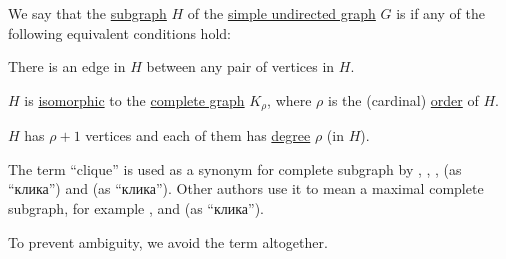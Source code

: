 \begin{definition}\label{def:complete_subgraph}\mimprovised
  We say that the \hyperref[def:undirected_graph/subgraph]{subgraph} \( H \) of the \hyperref[def:undirected_graph]{simple undirected graph} \( G \) is  if any of the following equivalent conditions hold:
  \begin{thmenum}
     There is an edge in \( H \) between any pair of vertices in \( H \).

     \( H \) is \hyperref[def:undirected_graph/homomorphism]{isomorphic} to the \hyperref[def:complete_graph]{complete graph} \( K_\rho \), where \( \rho \) is the (cardinal) \hyperref[def:graph_cardinality/order]{order} of \( H \).

     \( H \) has \( \rho + 1 \) vertices and each of them has \hyperref[def:graph_cardinality/undirected_degree]{degree} \( \rho \) (in \( H \)).
  \end{thmenum}
\end{definition}
\begin{comments}
  \item The term \enquote{clique} is used as a synonym for complete subgraph by , , ,  (as \enquote{клика}) and  (as \enquote{клика}). Other authors use it to mean a maximal complete subgraph, for example ,  and  (as \enquote{клика}).

  To prevent ambiguity, we avoid the term altogether.
\end{comments}

